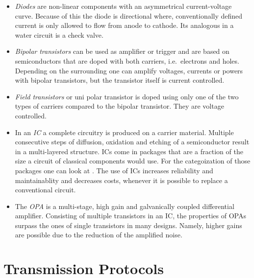 \begin{itemize}
  \item \emph{Diodes} are non-linear components with an asymmetrical current-voltage curve. Because of this the diode is directional where, conventionally defined current is only allowed to flow from anode to cathode. Its analogous in a water circuit is a check valve.
  \item \emph{Bipolar transistors} can be used as amplifier or trigger and are based on semiconductors that are doped with both carriers, i.e.\ electrons and holes. Depending on the surrounding one can amplify voltages, currents or powers with bipolar transistors, but the transistor itself is current controlled.
  \item \emph{Field transistors} or uni polar transistor is doped using only one of the two types of carriers compared to the bipolar transistor. They are voltage controlled.
  \item In an \emph{\acf{IC}} a complete circuitry is produced on a carrier material. Multiple consecutive steps of diffusion, oxidation and etching of a semiconductor result in a multi-layered structure. \ac{IC}s come in packages that are a fraction of the size a circuit of classical components would use. For the categoization of those packages one can look at . The use of \ac{IC}s increases reliability and maintainablity and decreases costs, whenever it is possible to replace a conventional circuit.
  \item The \emph{\acf{OPA}} is a multi-stage, high gain and galvanically coupled differential amplifier. Consisting of multiple transistors in an \ac{IC}, the properties of \ac{OPA}s surpass the ones of single transistors in many designs. Namely, higher gains are possible due to the reduction of the amplified noise.
\end{itemize}

\section{Transmission Protocols}

